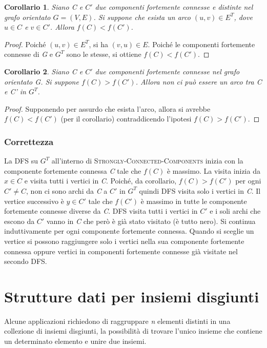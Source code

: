 \documentclass[10pt, a4paper]{report}
\newtheorem{corollario}{Corollario}[chapter]
\begin{document}
\begin{corollario}
Siano \textit{C} e $C'$ due componenti fortemente connesse e distinte nel grafo orientato $G = (V,E)$. Si suppone che esista un arco $(u,v) \in E^T$, dove $u \in C$ e $v \in C'$. Allora $f(C) < f(C')$.
\end{corollario}
\begin{proof}
Poiché $(u,v) \in E^T$, si ha $(v,u) \in E$. Poiché le componenti fortemente connesse di \textit{G} e $G^T$ sono le stesse, si ottiene $f(C) < f(C')$.
\end{proof}
\begin{corollario}
Siano \textit{C} e $C'$ due componenti fortemente connesse nel grafo orientato \textit{G}. Si suppone $f(C) > f(C')$. Allora non ci può essere un arco tra \textit{C} e \textit{C'} in $G^T$.
\end{corollario}
\begin{proof}
Supponendo per assurdo che esista l'arco, allora si avrebbe $f(C) < f(C')$ (per il corollario) contraddicendo l'ipotesi $f(C) > f(C')$.
\end{proof}
\subsection{Correttezza}
La \textsc{DFS} su $G^T$ all'interno di \textsc{Strongly-Connected-Components} inizia con la componente fortemente connessa \textit{C} tale che $f(C)$ è massimo. La visita inizia da $x \in C$ e visita tutti i vertici in \textit{C}. Poiché, da corollario, $f(C) > f(C')$ per ogni $C' \neq C$, non ci sono archi da \textit{C} a $C'$ in $G^T$ quindi \textsc{DFS} visita solo i vertici in \textit{C}. Il vertice successivo è $y \in C'$ tale che $f(C')$ è massimo in tutte le componente fortemente connesse diverse da \textit{C}. \textsc{DFS} visita tutti i vertici in $C'$ e i soli archi che escono da $C'$ vanno in \textit{C} che però è già stato visitato (è tutto nero). Si continua induttivamente per ogni componente fortemente connessa. Quando si sceglie un vertice si possono raggiungere solo i vertici nella sua componente fortemente connessa oppure vertici in componenti fortemente connesse già visitate nel secondo \textsc{DFS}.
\chapter{Strutture dati per insiemi disgiunti}
Alcune applicazioni richiedono di raggruppare \textit{n} elementi distinti in una collezione di insiemi disgiunti, la possibilità di trovare l'unico insieme che contiene un determinato elemento e unire due insiemi.
\end{document}
